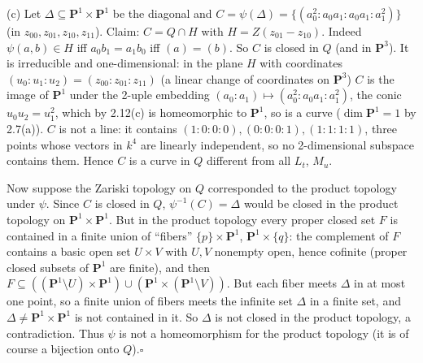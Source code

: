 \documentclass[11pt]{article}
\begin{document}
(c) Let $\Delta\subseteq\mathbf P^1\times\mathbf P^1$ be the diagonal and $C=\psi(\Delta)=\{(a_0^2:a_0a_1:a_0a_1:a_1^2)\}$ (in $z_{00},z_{01},z_{10},z_{11}$). Claim: $C=Q\cap H$ with $H=Z(z_{01}-z_{10})$. Indeed $\psi(a,b)\in H$ iff $a_0b_1=a_1b_0$ iff $(a)=(b)$. So $C$ is closed in $Q$ (and in $\mathbf P^3$). It is irreducible and one-dimensional: in the plane $H$ with coordinates $(u_0:u_1:u_2)=(z_{00}:z_{01}:z_{11})$ (a linear change of coordinates on $\mathbf P^3$) $C$ is the image of $\mathbf P^1$ under the 2-uple embedding $(a_0:a_1)\mapsto(a_0^2:a_0a_1:a_1^2)$, the conic $u_0u_2=u_1^2$, which by 2.12(c) is homeomorphic to $\mathbf P^1$, so is a curve ($\dim\mathbf P^1=1$ by 2.7(a)). $C$ is not a line: it contains $(1:0:0:0),(0:0:0:1),(1:1:1:1)$, three points whose vectors in $k^4$ are linearly independent, so no 2-dimensional subspace contains them. Hence $C$ is a curve in $Q$ different from all $L_t$, $M_u$.

Now suppose the Zariski topology on $Q$ corresponded to the product topology under $\psi$. Since $C$ is closed in $Q$, $\psi^{-1}(C)=\Delta$ would be closed in the product topology on $\mathbf P^1\times\mathbf P^1$. But in the product topology every proper closed set $F$ is contained in a finite union of ``fibers'' $\{p\}\times\mathbf P^1$, $\mathbf P^1\times\{q\}$: the complement of $F$ contains a basic open set $U\times V$ with $U,V$ nonempty open, hence cofinite (proper closed subsets of $\mathbf P^1$ are finite), and then $F\subseteq((\mathbf P^1\setminus U)\times\mathbf P^1)\cup(\mathbf P^1\times(\mathbf P^1\setminus V))$. But each fiber meets $\Delta$ in at most one point, so a finite union of fibers meets the infinite set $\Delta$ in a finite set, and $\Delta\ne\mathbf P^1\times\mathbf P^1$ is not contained in it. So $\Delta$ is not closed in the product topology, a contradiction. Thus $\psi$ is not a homeomorphism for the product topology (it is of course a bijection onto $Q$).\hfill$\square$
\end{document}
